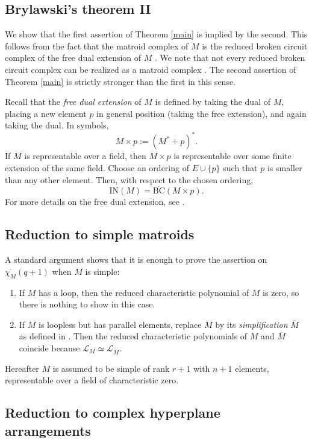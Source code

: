 \documentclass{compositio}
\theoremstyle{definition}
\theoremstyle{remark}
\begin{document}
\subsection{Brylawski's theorem II}

We show that the first assertion of Theorem \ref{main} is implied by the second. This follows from the fact that the matroid complex of $M$ is the reduced broken circuit complex of the free dual extension of $M$ \cite[Theorem 4.2]{Brylawski}. We note that not every reduced broken circuit complex can be realized as a matroid complex \cite[Remark 4.3]{Brylawski}. The second assertion of Theorem \ref{main} is strictly stronger than the first in this sense.


Recall that the \emph{free dual extension} of $M$ is defined by taking the dual of $M$, placing a new element $p$ in general position (taking the free extension), and again taking the dual. In symbols,
\[
M \times p := (M^* + p)^*.
\]
If $M$ is representable over a field, then $M \times p$ is representable over some finite extension of the same field. 
Choose an ordering of $E \cup \{p\}$ such that $p$ is smaller than any other element.
Then, with respect to the chosen ordering,
\[
\text{IN}(M)=\overline{\text{BC}}(M \times  p).
\]
For more details on the free dual extension, see \cite{Brylawski,BrylawskiBook,Lenz}.


\subsection{Reduction to simple matroids}

A standard argument shows that it is enough to prove the assertion on $\overline{\chi_M}(q+1)$ when $M$ is simple:

\begin{enumerate}[1.]
\item If $M$ has a loop, then the reduced characteristic polynomial of $M$ is zero, so there is nothing to show in this case.
\item If $M$ is loopless but has parallel elements, replace $M$ by its \emph{simplification} $\overline{M}$ as defined in \cite[Section 1.7]{Oxley}. Then 
the reduced characteristic polynomials of $M$ and $\overline{M}$ coincide 
because $\mathscr{L}_M \simeq \mathscr{L}_{\overline{M}}$. 
\end{enumerate}
Hereafter $M$ is assumed to be simple of rank $r+1$ with $n+1$ elements, representable over a field of characteristic zero.

\subsection{Reduction to complex hyperplane arrangements}
\end{document}
